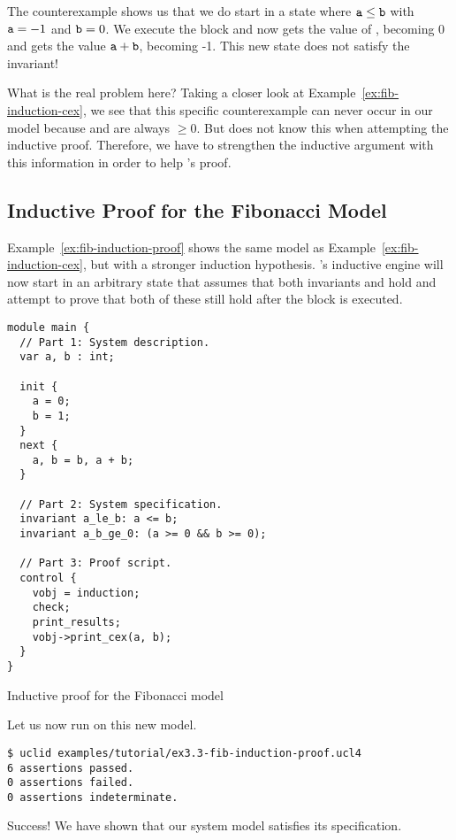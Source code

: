 The counterexample shows us that we do start in a state where $\texttt{a} \le \texttt{b}$ with $\texttt{a}=-1$ and $\texttt{b}=0$. We execute the  block and now  gets the value of , becoming 0 and  gets the value $\texttt{a} + \texttt{b}$, becoming -1. This new state does not satisfy the invariant!

What is the real problem here? Taking a closer look at Example~\ref{ex:fib-induction-cex}, we see that this specific counterexample can never occur in our model because  and  are always $\ge 0$. But \uclid{} does not know this when attempting the inductive proof. Therefore, we have to strengthen the inductive argument with this information in order to help \uclid{}'s proof.

\subsection{Inductive Proof for the Fibonacci Model}

Example~\ref{ex:fib-induction-proof} shows the same model as Example~\ref{ex:fib-induction-cex}, but with a stronger induction hypothesis. \uclid{}'s inductive engine will now start in an arbitrary state that assumes that both invariants  and  hold and attempt to prove that both of these still hold after the  block is executed.

\begin{uclidlisting}[htbp]
\begin{lstlisting}[language=uclid,style=uclidstyle]
module main {
  // Part 1: System description.
  var a, b : int;

  init {
    a = 0;
    b = 1;
  }
  next {
    a, b = b, a + b;
  }

  // Part 2: System specification.
  invariant a_le_b: a <= b;
  invariant a_b_ge_0: (a >= 0 && b >= 0);

  // Part 3: Proof script.
  control {
    vobj = induction;
    check;
    print_results;
    vobj->print_cex(a, b);
  }
}
\end{lstlisting}
\caption{Inductive proof for the Fibonacci model}
\label{ex:fib-induction-proof}
\end{uclidlisting}

Let us now run \uclid{} on this new model.

\begin{Verbatim}[frame=single, samepage=true]
$ uclid examples/tutorial/ex3.3-fib-induction-proof.ucl4 
6 assertions passed.
0 assertions failed.
0 assertions indeterminate.
\end{Verbatim}

Success! We have shown that our system model satisfies its specification.

